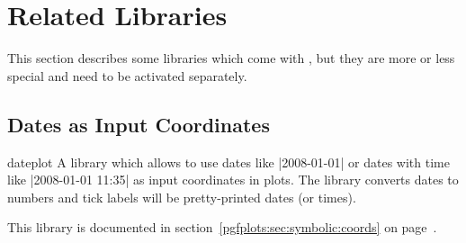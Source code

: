 \section{Related Libraries}
This section describes some libraries which come with \PGFPlots, but they are more or less special and need to be activated separately.

\subsection{Dates as Input Coordinates}
\begin{pgfplotslibrary}{dateplot}
	A library which allows to use dates like |2008-01-01| or dates with time like |2008-01-01 11:35| as input coordinates in plots. The library converts dates to numbers and tick labels will be pretty-printed dates (or times).

	This library is documented in section~\ref{pgfplots:sec:symbolic:coords} on page~\pageref{pgfplots:sec:date:coords}.
\end{pgfplotslibrary}

